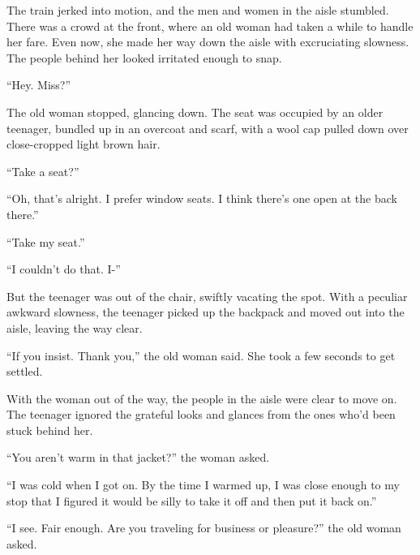 





The train jerked into motion, and the men and women in the aisle stumbled.  There was a crowd at the front, where an old woman had taken a while to handle her fare.  Even now, she made her way down the aisle with excruciating slowness.  The people behind her looked irritated enough to snap.



``Hey.  Miss?''



The old woman stopped, glancing down.  The seat was occupied by an older teenager, bundled up in an overcoat and scarf, with a wool cap pulled down over close-cropped light brown hair.



``Take a seat?''



``Oh, that's alright.  I prefer window seats.  I think there's one open at the back there.''



``Take my seat.''



``I couldn't do that.  I-''



But the teenager was out of the chair, swiftly vacating the spot.  With a peculiar awkward slowness, the teenager picked up the backpack and moved out into the aisle, leaving the way clear.



``If you insist.  Thank you,'' the old woman said.  She took a few seconds to get settled.



With the woman out of the way, the people in the aisle were clear to move on.  The teenager ignored the grateful looks and glances from the ones who'd been stuck behind her.



``You aren't warm in that jacket?'' the woman asked.



``I was cold when I got on.  By the time I warmed up, I was close enough to my stop that I figured it would be silly to take it off and then put it back on.''



``I see.  Fair enough.  Are you traveling for business or pleasure?'' the old woman asked.



